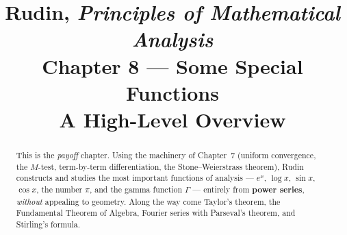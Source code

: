\documentclass[11pt]{article}
\title{\textbf{Rudin, \emph{Principles of Mathematical Analysis}}\\[4pt]
       Chapter 8 --- Some Special Functions\\[2pt]
       \large A High-Level Overview}
\author{}
\date{}
\theoremstyle{definition}
\theoremstyle{plain}
\begin{document}
\maketitle
\vspace{-2em}

\begin{abstract}
\noindent This is the \emph{payoff} chapter. Using the machinery of Chapter~7
(uniform convergence, the $M$-test, term-by-term differentiation, the
Stone--Weierstrass theorem), Rudin constructs and studies the most important
functions of analysis --- $e^x$, $\log x$, $\sin x$, $\cos x$, the number
$\pi$, and the gamma function $\Gamma$ --- entirely from \textbf{power series},
\emph{without} appealing to geometry. Along the way come Taylor's theorem, the
Fundamental Theorem of Algebra, Fourier series with Parseval's theorem, and
Stirling's formula.
\end{abstract}
\end{document}

